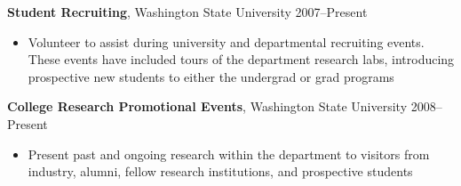 \textbf{Student Recruiting}, Washington State University \hfill 2007--Present
    \begin{itemize}
        \item{Volunteer to assist during university and departmental recruiting events.  These events have included tours of the department research labs, introducing prospective new students to either the undergrad or grad programs}
    \end{itemize}

\textbf{College Research Promotional Events}, Washington State University \hfill 2008--Present    \begin{itemize}
        \item{Present past and ongoing research within the department to visitors from industry, alumni, fellow research institutions, and prospective students}
    \end{itemize}
